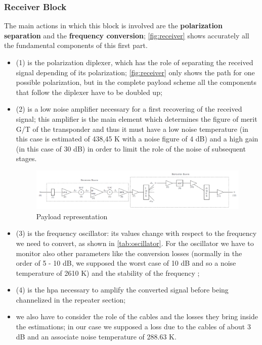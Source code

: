 \documentclass[11pt,a4paper,titlepage]{article}
\begin{document}
		\subsubsection{Receiver Block}
The main actions in which this block is involved are the \textbf{polarization separation} and the \textbf{frequency conversion}; \autoref{fig:receiver} shows accurately all the fundamental components of this first part.
		\begin{itemize}
		\item (1) is the polarization diplexer, which has the role of separating the received signal depending of its polarization; \autoref{fig:receiver} only shows the path for one possible polarization, but in the complete payload scheme all the components that follow the diplexer have to be doubled up;
		\item (2) is a low noise amplifier necessary for a first recovering of the received signal; this amplifier is the main element which determines the figure of merit G/T of the transponder and thus it must have a low noise temperature (in this case is estimated of 438,45 K with a noise figure of 4 dB) and a high gain (in this case of 30 dB) in order to limit the role of the noise of subsequent stages.
		\begin{figure}
		\centering
		\includegraphics[width = 1\textwidth]{Payload.png}
		\caption{Payload representation}
		\label{fig:payload}
		\end{figure}
		\item (3) is the frequency oscillator: its values change with respect to the frequency we need to convert, as shown in \autoref{tab:oscillator}. For the oscillator we have to monitor also other parameters like the conversion losses (normally in the order of 5 - 10 dB, we supposed the worst case of 10 dB and so a noise temperature of 2610 K) and the stability of the frequency \cite{Maral2017};	
		\item (4) is the \gls{hpa} necessary to amplify the converted signal before being channelized in the repeater section;
		\item we also have to consider the role of the cables and the losses they bring inside the estimations; in our case we supposed a loss due to the cables of about 3 dB \cite{Ippolito17} and an associate noise temperature of 288.63 K.
		\end{itemize}
\end{document}
